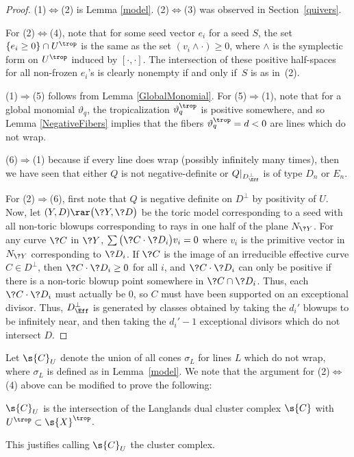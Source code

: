 \begin{proof}(1)$\Leftrightarrow$(2) is Lemma \ref{model}. (2)$\Leftrightarrow$(3) was observed in Section~\ref{quivers}.

For (2)$\Leftrightarrow$(4), note that for some seed vector $e_i$ for a seed $S$, the set $\{e_i\geq 0\}\cap U^{\trop}$ is the same as the set $(v_i\wedge \cdot) \geq 0$, where $\wedge$ is the symplectic form on $U^{\trop}$ induced by $[ \cdot,\cdot]$. The intersection of these positive half-spaces for all non-frozen $e_i$'s is clearly nonempty if and only if~$S$ is as in~(2).

 (1)$\Rightarrow$(5) follows from Lemma \ref{GlobalMonomial}. For (5)$\Rightarrow$(1), note that for a global monomial $\vartheta_q$, the tropicalization $\vartheta_q^{\trop}$ is positive somewhere, and so Lemma \ref{NegativeFibers} implies that the fibers $\vartheta_q^{\trop}=d<0$ are lines which do not wrap.

 (6)$\Rightarrow$(1) because if every line does wrap (possibly infinitely many times), then we have seen that either $Q$ is not negative-definite or $Q|_{D^{\perp}_{\Eff}}$ is of type $D_n$ or $E_n$.

 For (2)$\Rightarrow$(6), first note that $Q$ is negative definite on $D^{\perp}$ by positivity of $U$. Now, let $(Y,D)\rar \big(\?{Y},\?{D}\big)$ be the toric model corresponding to a seed with all non-toric blowups corresponding to rays in one half of the plane $N_{\?{Y}}$. For any curve $\?{C}$ in $\?{Y}$, $\sum \big(\?{C}\cdot \?{D}_i\big) v_i=0$ where $v_i$ is the primitive vector in $N_{\?{Y}}$ corresponding to $\?{D}_i$. If $\?{C}$ is the image of an irreducible effective curve $C\in D^{\perp}$, then $\?{C}\cdot \?{D}_i \geq 0$ for all $i$, and $\?{C}\cdot \?{D}_i$ can only be positive if there is a non-toric blowup point somewhere in $\?{C} \cap \?{D}_i$. Thus, each $\?{C}\cdot \?{D}_i$ must actually be $0$, so $C$ must have been supported on an exceptional divisor. Thus, $D^{\perp}_{\Eff}$ is generated by classes obtained by taking the $d_i'$ blowups to be infinitely near, and then taking the $d_i'-1$ exceptional divisors which do not intersect $D$.
\end{proof}

Let $\s{C}_U$ denote the union of all cones $\sigma_L$ for lines $L$ which do not wrap, where $\sigma_L$ is defined as in Lemma~\ref{model}. We note that the argument for (2)$\Leftrightarrow$(4) above can be modified to prove the following:
\begin{prop} $\s{C}_U$ is the intersection of the Langlands dual cluster complex $\s{C}$ with $U^{\trop}\subset \s{X}^{\trop}$.
\end{prop}
This justifies \cite{Man1} calling $\s{C}_U$ the cluster complex.

